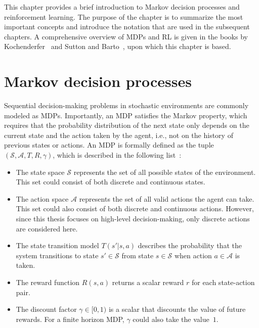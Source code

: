 This chapter provides a brief introduction to Markov decision processes and reinforcement learning.
The purpose of the chapter is to summarize the most important concepts and introduce the notation that are used in the subsequent chapters. 
A comprehensive overview of MDPs and RL is given in the books by Kochenderfer~\cite{Kochenderfer2015} and Sutton and Barto~\cite{Sutton2018}, upon which this chapter is based.


\section{Markov decision processes}
\label{sec:mdp}
Sequential decision-making problems in stochastic environments are commonly modeled as MDPs. Importantly, an MDP satisfies the Markov property, which requires that the probability distribution of the next state only depends on the current state and the action taken by the agent, i.e., not on the history of previous states or actions. An MDP is formally defined as the tuple $( \mathcal{S}, \mathcal{A}, T, R, \gamma )$, which is described in the following list~\cite[Ch. 4]{Kochenderfer2015}:
%
\begin{itemize}
    \item The state space $\mathcal{S}$ represents the set of all possible states of the environment. This set could consist of both discrete and continuous states.
    \item The action space $\mathcal{A}$ represents the set of all valid actions the agent can take. This set could also consist of both discrete and continuous actions. However, since this thesis focuses on high-level decision-making, only discrete actions are considered here.
    \item The state transition model $T(s'|s,a)$ describes the probability that the system transitions to state $s' \in \mathcal{S}$ from state $s \in \mathcal{S}$ when action $a \in \mathcal{A}$ is taken.
    \item The reward function $R(s,a)$ returns a scalar reward $r$ for each state-action pair.
    \item The discount factor $\gamma \in [0,1)$ is a scalar that discounts the value of future rewards. For a finite horizon MDP, $\gamma$ could also take the value~$1$.
\end{itemize}

